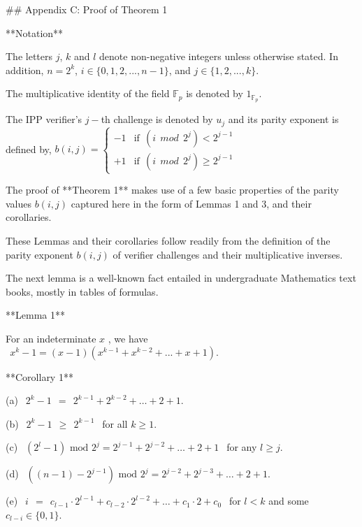 

 

## Appendix C: Proof of Theorem 1 



**Notation**

The letters  $j$,  $k$  and  $ l$  denote non-negative integers unless otherwise stated. In addition,  $n = 2^k$, $ i \in \{ 0, 1, 2, ... , n-1 \}$, and  $j \in \{ 1, 2, ... , k \}$. 

The multiplicative identity of the field  $\mathbb{F}_p$  is denoted by  $1_{\mathbb{F}_p}$. 

The IPP verifier's  $j-$th challenge is denoted by  $u_j$  and its parity exponent is defined by,   $b(i,j) = \begin{cases} {-1} & {\text{if}\ \ (i\ \ mod\ \ 2^j) < 2^{j-1}} \\ {+1} & {\text{if}\ \ (i\ \ mod\ \ 2^j) \geq 2^{j-1}} \end{cases} $  



The proof of **Theorem 1** makes use of a few basic properties of the parity values  $b(i,j)$  captured here in the form of Lemmas 1 and  3, and their corollaries. 

These Lemmas and their corollaries follow readily from the definition of the parity exponent  $b(i,j)$  of verifier challenges and their multiplicative inverses. 

The next lemma is a well-known fact entailed in undergraduate Mathematics text books, mostly in tables of formulas.  

**Lemma 1**

For an indeterminate  $x$ , we have  $ \ \ x^k - 1 = (x - 1)(x^{k-1} + x^{k-2} + ... + x + 1) .$ 



**Corollary 1**

(a) $ \ \ 2^k - 1\ \ =\ \ 2^{k-1} + 2^{k-2} + \dots + 2 + 1$. 

(b) $ \ \ 2^k - 1\ \ \geq\ \ 2^{k-1}\ \ $ for all $ k \geq 1$. 

(c) $ \ \ (2^l - 1) \text{ mod } 2^j = 2^{j-1} + 2^{j-2} + \dots +  2 + 1\ \ $  for any  $l \geq j$.

(d) $ \ \ ((n - 1) - 2^{j-1}) \text{ mod } 2^j = 2^{j-2} + 2^{j-3} + \dots +  2 + 1 $.

(e) $ \ \ i\ \  =\ \ c_{l-1} \cdot 2^{l-1} + c_{l-2} \cdot 2^{l-2} + \dots + c_1 \cdot 2 + c_0\ \ $ for  $ l < k $  and some  $ c_{l-i} \in \{ 0 , 1 \}$.



